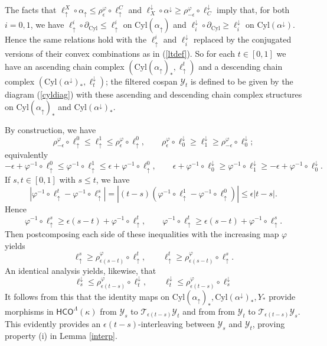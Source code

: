 \documentclass[11pt]{amsart}
\theoremstyle{definition}
\theoremstyle{remark}
\numberwithin{equation}{section}
\def\ep{\epsilon}
\begin{document}
	The facts that $\ell^{X}_{\uparrow}\circ\alpha_{\uparrow}\leq \rho_{\ep}^{\varphi}\circ\ell_{\uparrow}^{C}$ and $\ell^{\downarrow}_X\circ\alpha^{\downarrow}\geq \rho_{-\ep}^{\varphi}\circ\ell_{C}^{\downarrow}$
	imply that, for both $i=0,1$, we have $\ell_{\uparrow}^i\circ\partial_{\mathrm{Cyl}}\leq \ell_{\uparrow}^{i}$ on $\mathrm{Cyl}(\alpha_{\uparrow})$ and $\ell^{\downarrow}_{i}\circ\partial_{\mathrm{Cyl}}\geq \ell^{\downarrow}_{i}$ on $\mathrm{Cyl}(\alpha^{\downarrow})$.  Hence the same relations hold with the $\ell_{\uparrow}^{i}$  and $\ell^{\downarrow}_i$ replaced by the conjugated versions of their convex combinations as in (\ref{ltdef}).  So for each $t\in [0,1]$
	we have an ascending chain complex $(\mathrm{Cyl}(\alpha_{\uparrow})_*,\ell_{\uparrow}^{t})$ and a descending chain complex $(\mathrm{Cyl}(\alpha^{\downarrow})_*,\ell^{\downarrow}_t)$; the filtered cospan $\mathcal{Y}_t$ is defined to be given by the diagram (\ref{cyldiag}) with these ascending and descending chain complex structures on 
	$\mathrm{Cyl}(\alpha_{\uparrow})_*$ and $\mathrm{Cyl}(\alpha^{\downarrow})_*$.
	
	By construction, we have \[ \rho^{\varphi}_{-\ep}\circ \ell_{\uparrow}^{0}\leq \ell_{\uparrow}^{1}\leq \rho_{\ep}^{\varphi}\circ\ell_{\uparrow}^{0},\qquad \rho_{\ep}^{\varphi}\circ\ell^{\downarrow}_{0}\geq \ell^{\downarrow}_{1}\geq \rho_{-\ep}^{\varphi}\circ\ell^{\downarrow}_{0}; \] equivalently \[ -\ep+\varphi^{-1}\circ\ell_{\uparrow}^{0}\leq \varphi^{-1}\circ\ell_{\uparrow}^{1}\leq \ep+\varphi^{-1}\circ\ell_{\uparrow}^{0},\qquad \ep+\varphi^{-1}\circ\ell^{\downarrow}_{0}\geq \varphi^{-1}\circ\ell^{\downarrow}_{1}\geq -\ep+\varphi^{-1}\circ\ell^{\downarrow}_{0}.   \]
	If $s,t\in [0,1]$ with $s\leq t$, we have \[ \left|\varphi^{-1}\circ \ell_{\uparrow}^{t}-\varphi^{-1}\circ \ell_{\uparrow}^{s}\right|=\left|(t-s)(\varphi^{-1}\circ \ell_{\uparrow}^{1}-\varphi^{-1}\circ \ell_{\uparrow}^{0})\right|\leq \ep|t-s|.  \] Hence 
	 \[ \varphi^{-1}\circ \ell_{\uparrow}^{s}\geq \ep(s-t)+\varphi^{-1}\circ\ell_{\uparrow}^{t}, \qquad \varphi^{-1}\circ\ell_{\uparrow}^{t}\geq \ep(s-t)+\varphi^{-1}\circ\ell_{\uparrow}^{s}.\]  Then postcomposing each side of these inequalities with the increasing map $\varphi$ yields \[ \ell_{\uparrow}^{s}\geq \rho_{\ep(s-t)}^{\varphi}\circ\ell_{\uparrow}^{t},\qquad \ell_{\uparrow}^{t}\geq \rho_{\ep(s-t)}^{\varphi}\circ\ell_{\uparrow}^{s}.  \]  An identical analysis yields, likewise, that \[ \ell^{\downarrow}_{s}\leq \rho_{\ep(t-s)}^{\varphi}\circ\ell^{\downarrow}_{t},\qquad \ell^{\downarrow}_{t}\leq \rho_{\ep(t-s)}^{\varphi}\circ\ell^{\downarrow}_{s}\]
	It follows from this that the identity maps on $\mathrm{Cyl}(\alpha_{\uparrow})_*,\mathrm{Cyl}(\alpha^{\downarrow})_*,Y_*$  provide morphisms in $\mathsf{HCO}^{\Lambda}(\kappa)$ from $\mathcal{Y}_s$ to $\mathcal{T}_{\ep(t-s)}\mathcal{Y}_t$ and from  from $\mathcal{Y}_t$ to $\mathcal{T}_{\ep(t-s)}\mathcal{Y}_s$.  This evidently provides an $\ep(t-s)$-interleaving between $\mathcal{Y}_s$ and $\mathcal{Y}_t$, proving property (i) in Lemma \ref{interp}.
	
\end{document}
